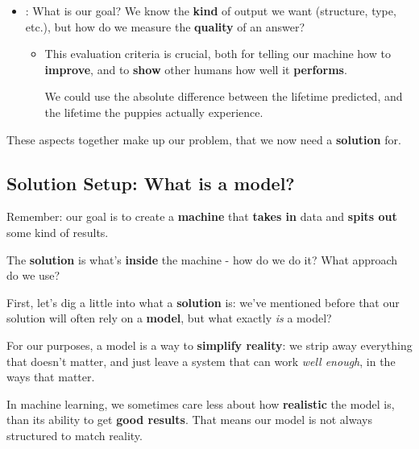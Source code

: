 \begin{itemize}
\begin{itemize}
                
                    \end{itemize}
                \item {}: What is our goal? We know the \textbf{kind} of output we want (structure, type, etc.), but how do we measure the \textbf{quality} of an answer?
                
                    \begin{itemize}
                        \item This evaluation criteria is crucial, both for telling our machine how to \textbf{improve}, and to \textbf{show} other humans how well it \textbf{performs}.
                        
                        \miniex We could use the absolute difference between the lifetime predicted, and the lifetime the puppies actually experience. 
                    \end{itemize}
            \end{itemize}
            
        These aspects together make up our problem, that we now need a \textbf{solution} for.
            
    \subsection{Solution Setup: What is a model?}
    
        Remember: our goal is to create a \textbf{machine} that \textbf{takes in} data and \textbf{spits out} some kind of results. 
    
        The \textbf{solution} is what's \textbf{inside} the machine - how do we do it? What approach do we use? 
        
        First, let's dig a little into what a \textbf{solution} is: we've mentioned before that our solution will often rely on a \textbf{model}, but what exactly \textit{is} a model?
        
        For our purposes, a model is a way to \textbf{simplify reality}: we strip away everything that doesn't matter, and just leave a system that can work \textit{well enough}, in the ways that matter.
        
        In machine learning, we sometimes care less about how \textbf{realistic} the model is, than its ability to get \textbf{good results}. That means our model is not always structured to match reality.
        \\
        
